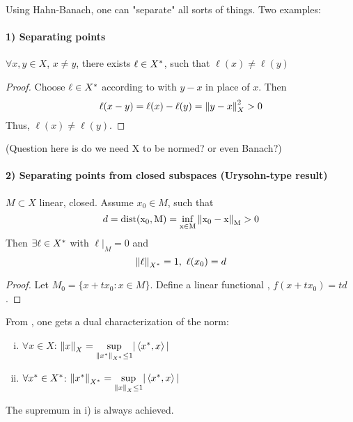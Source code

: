 \documentclass{article}
\begin{document}
Using Hahn-Banach, one can "separate" all sorts of things. Two examples:  

\paragraph{1) Separating points}  

\begin{proposition}
$\forall x,y \in X$, $x\neq y$, there exists $\ell \in {X}^*$, such that $\ell(x) \neq \ell(y)$
\end{proposition}  

\begin{proof}
    Choose $\ell \in {X}^*$ according to  with $y-x$ in place of $x$.  
    Then  
    $$\ell (x-y) = \ell(x) - \ell(y) = \left\|{y-x}\right\|^2_X >0$$ 
    Thus, $\ell(x) \neq \ell(y)$.
\end{proof}

\begin{unexaminable}
	(Question here is do  we need X to be normed? or even Banach?)
\end{unexaminable}

\paragraph{2) Separating points from closed subspaces (Urysohn-type result)}

\begin{theorem}
$M \subset X$ linear, closed. Assume $x_0 \in M$, such that  
$$d = \rm{dist} (x_0, M) = \inf_{x \in M} \left\|{x_0-x}\right\|_M >0$$
Then $\exists \ell \in {X}^*$ with $\ell|_M=0$ and  
$$\left\|{\ell}\right\|_{{X}^*}=1, \  \ell(x_0)=d$$
\end{theorem}

\begin{proof}
	Let $M_0=\{x+t x_0: x\in M\}$. Define a linear functional , $f(x+tx_0)=td$.
\end{proof}

From , one gets a dual characterization of the norm:  

\begin{corollary}
\label{dualilty of norm}
\end{corollary}
\begin{enumerate}[i)]
    \item $\forall x \in X$: $\left\|{x}\right\|_X = \underset{{\left\|{x^*}\right\|_{{X}^*} \leq 1}}{\sup} |\left<{{x}^*},{x}\right>|$
    \item $\forall {x}^* \in {X}^*$: $\left\|{{x}^*}\right\|_{{X}^*} = \underset{{\left\|{x}\right\|_X \leq 1}}{\sup} |\left<{{x}^*},{x}\right>|$
\end{enumerate}
The supremum in i) is always achieved.  
\end{document}

